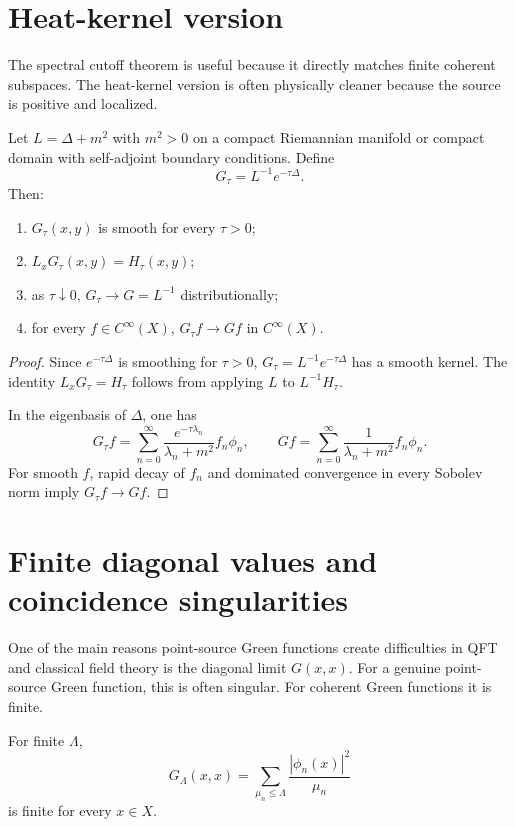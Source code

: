 \documentclass[11pt]{article}
\begin{document}
\section{Heat-kernel version}

The spectral cutoff theorem is useful because it directly matches finite coherent subspaces. The heat-kernel version is often physically cleaner because the source is positive and localized.

\begin{theorem}
Let \(L=\Delta+m^2\) with \(m^2>0\) on a compact Riemannian manifold or compact domain with self-adjoint boundary conditions. Define
\[
G_\tau=L^{-1}e^{-\tau\Delta}.
\]
Then:
\begin{enumerate}
\item \(G_\tau(x,y)\) is smooth for every \(\tau>0\);
\item \(L_xG_\tau(x,y)=H_\tau(x,y)\);
\item as \(\tau\downarrow0\), \(G_\tau\to G=L^{-1}\) distributionally;
\item for every \(f\in C^\infty(X)\), \(G_\tau f\to Gf\) in \(C^\infty(X)\).
\end{enumerate}
\end{theorem}

\begin{proof}
Since \(e^{-\tau\Delta}\) is smoothing for \(\tau>0\), \(G_\tau=L^{-1}e^{-\tau\Delta}\) has a smooth kernel. The identity \(L_xG_\tau=H_\tau\) follows from applying \(L\) to \(L^{-1}H_\tau\).

In the eigenbasis of \(\Delta\), one has
\[
G_\tau f=\sum_{n=0}^\infty \frac{e^{-\tau\lambda_n}}{\lambda_n+m^2} f_n\phi_n,
\qquad
Gf=\sum_{n=0}^\infty \frac{1}{\lambda_n+m^2} f_n\phi_n.
\]
For smooth \(f\), rapid decay of \(f_n\) and dominated convergence in every Sobolev norm imply \(G_\tau f\to Gf\). 
\end{proof}

\section{Finite diagonal values and coincidence singularities}

One of the main reasons point-source Green functions create difficulties in QFT and classical field theory is the diagonal limit \(G(x,x)\). For a genuine point-source Green function, this is often singular. For coherent Green functions it is finite.

\begin{proposition}
For finite \(\Lambda\),
\begin{equation}
G_\Lambda(x,x)=\sum_{\mu_n\le\Lambda}\frac{|\phi_n(x)|^2}{\mu_n}
\end{equation}
is finite for every \(x\in X\).
\end{proposition}
\end{document}
